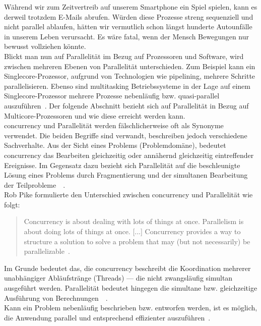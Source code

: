Während wir zum Zeitvertreib auf unserem Smartphone ein Spiel spielen, kann es derweil trotzdem E-Mails abrufen. Würden diese Prozesse streng sequenziell und nicht parallel ablaufen, hätten wir vermutlich schon längst hunderte Autounfälle in unserem Leben verursacht. Es wäre fatal, wenn der Mensch Bewegungen nur bewusst vollziehen könnte.\\
Blickt man nun auf Parallelität im Bezug auf Prozessoren und Software, wird zwischen mehreren Ebenen von Parallelität unterschieden. Zum Beispiel kann ein Singlecore-Prozessor, aufgrund von Technologien wie \gls{pipelining}, mehrere Schritte parallelisieren. Ebenso sind \gls{multitasking} Betriebssysteme in der Lage auf einem Singlecore-Prozessor mehrere Prozesse nebenläufig bzw. quasi-parallel auszuführen~\cite[S.~3~\&~S.~4]{butcher_seven_2014}. Der folgende Abschnitt bezieht sich auf Parallelität in Bezug auf Multicore-Prozessoren und wie diese erreicht werden kann.\\
\gls{concurrency} und Parallelität werden fälschlicherweise oft als Synonyme verwendet. Die beiden Begriffe sind verwandt, beschreiben jedoch verschiedene Sachverhalte. Aus der Sicht eines Problems (Problemdomäne), bedeutet \gls{concurrency} das Bearbeiten gleichzeitig oder annähernd gleichzeitig eintreffender Ereignisse. Im Gegensatz dazu bezieht sich Parallelität auf die beschleunigte Lösung eines Problems durch Fragmentierung und der simultanen Bearbeitung der Teilprobleme~\cite[S.~1~\&~S.~2]{butcher_seven_2014}~\cite[S.~15]{vernon_reactive_2016}.\\
Rob Pike formulierte den Unterschied zwischen \gls{concurrency} und Parallelität wie folgt:

\begin{quotation}
  Concurrency is about dealing with lots of things at once. Parallelism is about doing lots of things at once. [...] Concurrency provides a way to structure a solution to solve a problem that may (but not necessarily) be parallelizable~.
\cite[S.~10]{pike_concurrency_2012}
\end{quotation}

Im Grunde bedeutet das, die \gls{concurrency} beschreibt die Koordination mehrerer unabhängiger Abläufstränge (Threads) --- die nicht zwangsläufig simultan ausgeführt werden. Parallelität bedeutet hingegen die simultane bzw. gleichzeitige Ausführung von Berechnungen~\cite[S.~8-9]{pike_concurrency_2012}~\cite[S.~3]{butcher_seven_2014}.\\

Kann ein Problem nebenläufig beschrieben bzw. entworfen werden, ist es möglich, die Anwendung parallel und entsprechend effizienter auszuführen~\cite[S.~19~\&~S.~30]{pike_concurrency_2012}.\\

